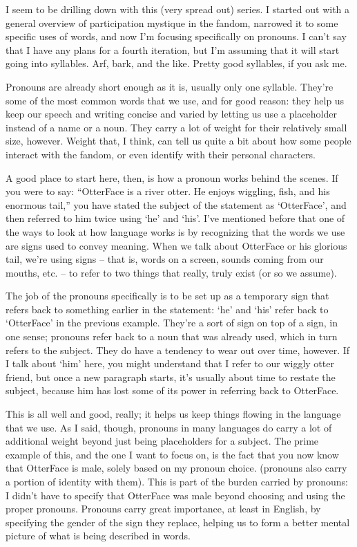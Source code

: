 
I seem to be drilling down with this (very spread out) series.  I started out with a general overview of participation mystique in the fandom, narrowed it to some specific uses of words, and now I'm focusing specifically on pronouns.  I can't say that I have any plans for a fourth iteration, but I'm assuming that it will start going into syllables.  Arf, bark, and the like.  Pretty good syllables, if you ask me.

Pronouns are already short enough as it is, usually only one syllable.  They're some of the most common words that we use, and for good reason: they help us keep our speech and writing concise and varied by letting us use a placeholder instead of a name or a noun.  They carry a lot of weight for their relatively small size, however. Weight that, I think, can tell us quite a bit about how some people interact with the fandom, or even identify with their personal characters.

A good place to start here, then, is how a pronoun works behind the scenes.  If you were to say: ``OtterFace is a river otter.  He enjoys wiggling, fish, and his enormous tail,'' you have stated the subject of the statement as `OtterFace', and then referred to him twice using `he' and `his'.  I've mentioned before that one of the ways to look at how language works is by recognizing that the words we use are signs used to convey meaning.  When we talk about OtterFace or his glorious tail, we're using signs – that is, words on a screen, sounds coming from our mouths, etc. – to refer to two things that really, truly exist (or so we assume).

The job of the pronouns specifically is to be set up as a temporary sign that refers back to something earlier in the statement: `he' and `his' refer back to `OtterFace' in the previous example.  They're a sort of sign on top of a sign, in one sense; pronouns refer back to a noun that was already used, which in turn refers to the subject.  They do have a tendency to wear out over time, however.  If I talk about `him' here, you might understand that I refer to our wiggly otter friend, but once a new paragraph starts, it's usually about time to restate the subject, because him has lost some of its power in referring back to OtterFace.

This is all well and good, really; it helps us keep things flowing in the language that we use.  As I said, though, pronouns in many languages do carry a lot of additional weight beyond just being placeholders for a subject.  The prime example of this, and the one I want to focus on, is the fact that you now know that OtterFace is male, solely based on my pronoun choice. (pronouns also carry a portion of identity with them).  This is part of the burden carried by pronouns: I didn't have to specify that OtterFace was male beyond choosing and using the proper pronouns.  Pronouns carry great importance, at least in English, by specifying the gender of the sign they replace, helping us to form a better mental picture of what is being described in words.

